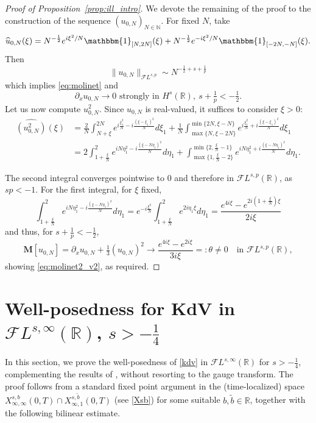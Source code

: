 \documentclass[a4paper,
11pt,  reqno]{amsart}
\newcommand{\5}{\textup{V}}
\newcommand{\noi}{\noindent}
\newcommand{\FL}{\mathcal{F} L}
\newcommand{\F}{\mathcal{F}}
\newcommand{\wt}{\widetilde}
\newcommand{\dx}{\partial_x}
\theoremstyle{remark}
\newcommand{\R}{\mathbb{R}}
\newcommand{\MMb}{\mathbf{M}}
\newcommand{\N}{\mathbb{N}}
\numberwithin{equation}{section}
\numberwithin{theorem}{section}
\begin{document}
\begin{proof}[Proof of Proposition~\ref{prop:ill_intro}]
We devote the remaining of the proof to the construction of the sequence $(u_{0,N})_{N\in\N}$.
	For fixed $N$, take
	$$
	\widehat{u}_{0,N}(\xi)= N^{-\frac12} e^{i\xi^2/N}\mathbbm{1}_{[N, 2N]}(\xi) + N^{-\frac12} e^{-i\xi^2/N}\mathbbm{1}_{[-2N, -N]}(\xi).
	$$
	Then
	$$
	\|u_{0,N}\|_{\mathcal{F}L^{s,p}} \sim N^{-\frac12 +s+ \frac1p}
	$$
	which implies \eqref{eq:molinet} and
	$$
	\dx u_{0,N} \to 0 \mbox{ strongly in }H^{s}(\R), \ s+\tfrac1p<-\tfrac12.
	$$
	Let us now compute $u_{0,N}^2$. Since $u_{0,N}$ is real-valued, it suffices to consider $\xi>0$:
	\begin{align*}
		\widehat{(u_{0,N}^2)}(\xi) &= \frac{2}{N}\int_{N+\xi}^{2N} e^{i\frac{\xi_1^2}{N}-i\frac{(\xi-\xi_1)^2}{N}}d\xi_1 + \frac{1}{N}\int_{\max\{N, \xi-2N\}}^{\min\{2N, \xi-N\}}  e^{i\frac{\xi_1^2}{N}+i\frac{(\xi-\xi_1)^2}{N}}d\xi_1\\&=2\int_{1+\frac\xi N}^{2} e^{iN\eta_1^2-i\frac{(\xi-N\eta_1)^2}{N}}d\eta_1 + \int_{\max\{1, \frac{\xi}{N}-2\}}^{\min\{2, \frac{\xi}{N}-1\}}  e^{iN\eta_1^2+i\frac{(\xi-N\eta_1)^2}{N}}d\eta_1
        .
	\end{align*}


    \noi
The second integral converges pointwise to $0$ and therefore in $\mathcal{F}L^{s,p}(\R)$, as $sp<-1$. For the first integral,  for $\xi$ fixed,
\begin{equation}
	\int_{1+\frac\xi N}^{2} e^{iN\eta_1^2-i\frac{(\xi-N\eta_1)^2}{N}}d\eta_1 = e^{-i\frac{\xi^2}{N}}\int_{1 + \frac{\xi}{N}}^{2} e^{2i\eta_1\xi}d\eta_1  = \frac{e^{4i\xi}-e^{2i\left(1+\frac{\xi}{N}\right)\xi}}{2i\xi}
\end{equation}
and thus, for $s+\frac1p<-\frac12$,
\begin{equation}
	\MMb[u_{0,N}]= \dx u_{0,N} + \tfrac13 (u_{0,N})^2 \to \frac{e^{4i\xi}-e^{2i\xi}}{3i\xi} =: \theta \ne 0
    \quad \mbox{in }\mathcal{F}L^{s,p}(\R),
\end{equation}
showing \eqref{eq:molinet2_v2}, as required.
\end{proof}


\appendix




\section{Well-posedness for KdV in $\F L^{s,\infty}(\R)$, $s>-\frac14$}\label{sec:-14}

In this section, we prove the well-posedness of \eqref{kdv}
 in $\FL^{s, \infty}(\R)$ for $s>-\frac14$, complementing the results of \cite{Grunrock_ldv_hier}, without resorting to the gauge transform.
The proof follows from a standard fixed point argument in the (time-localized) space $X^{s, b}_{\infty, \infty} (0,T) \cap X^{s, \wt b }_{\infty, 1} (0,T)$ (see \eqref{Xsb}) for some  suitable $b,\wt b\in \R$,
together with the following bilinear estimate.
\end{document}

